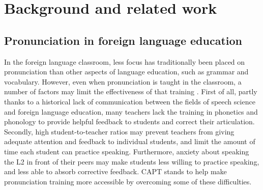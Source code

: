 %
%
\chapter{Background and related work}
\label{chap:background}



	\section{Pronunciation in foreign language education}
	\label{sec:capt:l2ed}
%	


In the foreign language classroom, less focus has traditionally been placed on pronunciation than other aspects of language education, such as grammar and vocabulary. %
However, even when pronunciation is taught in the classroom, a number of factors may limit the effectiveness of that training \citep{Neri2002,Derwing2005}. First of all, partly thanks to a historical lack of communication between the fields of speech science and foreign language education, many teachers lack the training in phonetics and phonology to provide helpful feedback to students and correct their articulation. Secondly, high student-to-teacher ratios may prevent teachers from giving adequate attention and feedback to individual students, and limit the amount of time each student can practice speaking. Furthermore, anxiety about speaking the L2 in front of their peers may make students less willing to practice speaking, and less able to absorb corrective feedback.
CAPT stands to help make pronunciation training more accessible by overcoming some of these difficulties. 

